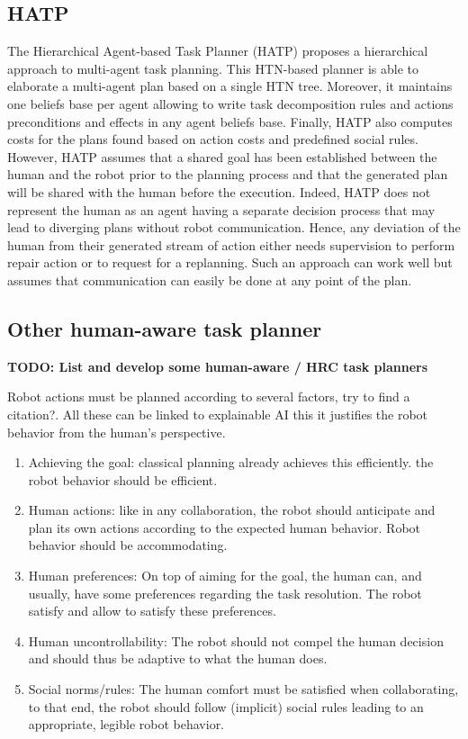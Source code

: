 \subsection{HATP}
The Hierarchical Agent-based Task Planner (HATP) proposes a hierarchical approach to multi-agent task planning. This HTN-based planner is able to elaborate a multi-agent plan based on a single HTN tree. Moreover, it maintains one beliefs base per agent allowing to write task decomposition rules and actions preconditions and effects in any agent beliefs base. Finally, HATP also computes costs for the plans found based on action costs and predefined social rules. However, HATP assumes that a shared goal has been established between the human and the robot prior to the planning process and that the generated plan will be shared with the human before the execution. Indeed, HATP does not represent the human as an agent having a separate decision process that may lead to diverging plans without robot communication. Hence, any deviation of the human from their generated stream of action either needs supervision to perform repair action or to request for a replanning. Such an approach can work well but assumes that communication can easily be done at any point of the plan.  

\subsection{Other human-aware task planner}

\textbf{TODO: List and develop some human-aware / HRC task planners}

Robot actions must be planned according to several factors, try to find a citation?. All these can be linked to explainable AI this it justifies the robot behavior from the human's perspective. 

\begin{enumerate}
    \item Achieving the goal: classical planning already achieves this efficiently. the robot behavior should be efficient.
    \item Human actions: like in any collaboration, the robot should anticipate and plan its own actions according to the expected human behavior.  Robot behavior should be accommodating.
    \item Human preferences: On top of aiming for the goal, the human can, and usually, have some preferences regarding the task resolution. The robot satisfy and allow to satisfy these preferences.
    \item Human uncontrollability: The robot should not compel the human decision and should thus be adaptive to what the human does.
    \item Social norms/rules: The human comfort must be satisfied when collaborating, to that end, the robot should follow (implicit) social rules leading to an appropriate, legible robot behavior.
\end{enumerate}

